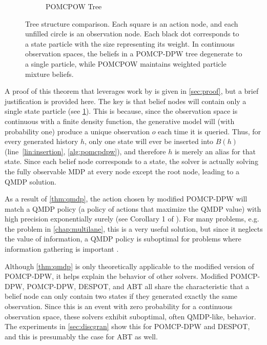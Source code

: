 \begin{figure}[htpb]
\begin{subfigure}[b]{0.45\columnwidth}
        \caption{POMCPOW Tree}
    \end{subfigure}
    \caption[POMCP-DPW and POMCPOW tree structure comparison]{Tree structure comparison. Each square is an action node, and each unfilled circle is an observation node. Each black dot corresponds to a state particle with the size representing its weight. In continuous observation spaces, the beliefs in a POMCP-DPW tree degenerate to a single particle, while POMCPOW maintains weighted particle mixture beliefs.}
    \label{fig:treecomp}
\end{figure}



A proof of this theorem that leverages work by \citet{auger2013continuous} is given in \cref{sec:proof}, but a brief justification is provided here.
The key is that belief nodes will contain only a single state particle (see \cref{fig:treecomp}).
This is because, since the observation space is continuous with a finite density function, the generative model will (with probability one) produce a unique observation $o$ each time it is queried.
Thus, for every generated history $h$, only one state will ever be inserted into $B(h)$ (line~\ref{lin:insertion}, \cref{alg:pomcpdpw}), and therefore $h$ is merely an alias for that state. 
Since each belief node corresponds to a state, the solver is actually solving the fully observable MDP at every node except the root node, leading to a QMDP solution.

As a result of \cref{thm:qmdp}, the action chosen by modified POMCP-DPW will match a QMDP policy (a policy of actions that maximize the QMDP value) with high precision exponentially surely (see Corollary 1 of \citet{auger2013continuous}).
For many problems, e.g. the problem in \cref{chap:multilane}, this is a very useful solution, but since it neglects the value of information, a QMDP policy is suboptimal for problems where information gathering is important \cite{littman1995learning,kochenderfer2015decision}.

Although \cref{thm:qmdp} is only theoretically applicable to the modified version of POMCP-DPW, it helps explain the behavior of other solvers.
Modified POMCP-DPW, POMCP-DPW, DESPOT, and ABT all share the characteristic that a belief node can only contain two states if they generated exactly the same observation.
Since this is an event with zero probability for a continuous observation space, these solvers exhibit suboptimal, often QMDP-like, behavior.
The experiments in \cref{sec:discgran} show this for POMCP-DPW and DESPOT, and this is presumably the case for ABT as well.


